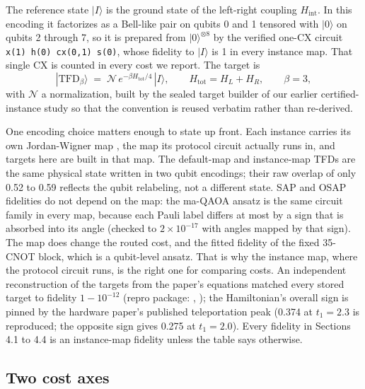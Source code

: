 \documentclass[11pt]{article}
\begin{document}
The reference state $|I\rangle$ is the ground state of the left-right coupling $H_{\mathrm{int}}$. In this encoding it factorizes as a Bell-like pair on qubits 0 and 1 tensored with $|0\rangle$ on qubits 2 through 7, so it is prepared from $|0\rangle^{\otimes 8}$ by the verified one-CX circuit \texttt{x(1) h(0) cx(0,1) s(0)}, whose fidelity to $|I\rangle$ is 1 in every instance map. That single CX is counted in every cost we report. The target is
\begin{equation}
|\mathrm{TFD}_\beta\rangle \;=\; \mathcal{N}\, e^{-\beta H_{\mathrm{tot}}/4}\,|I\rangle, \qquad H_{\mathrm{tot}} = H_L + H_R, \qquad \beta = 3,
\end{equation}
with $\mathcal{N}$ a normalization, built by the sealed target builder of our earlier certified-instance study so that the convention is reused verbatim rather than re-derived.

One encoding choice matters enough to state up front. Each instance carries its own Jordan-Wigner map \cite{jordanwigner1928}, the map its protocol circuit actually runs in, and targets here are built in that map. The default-map and instance-map TFDs are the same physical state written in two qubit encodings; their raw overlap of only 0.52 to 0.59 reflects the qubit relabeling, not a different state. SAP and OSAP fidelities do not depend on the map: the ma-QAOA ansatz is the same circuit family in every map, because each Pauli label differs at most by a sign that is absorbed into its angle (checked to $2\times 10^{-17}$ with angles mapped by that sign). The map does change the routed cost, and the fitted fidelity of the fixed 35-CNOT block, which is a qubit-level ansatz. That is why the instance map, where the protocol circuit runs, is the right one for comparing costs. An independent reconstruction of the targets from the paper's equations matched every stored target to fidelity $1 - 10^{-12}$ (repro package: , ); the Hamiltonian's overall sign is pinned by the hardware paper's published teleportation peak (0.374 at $t_1 = 2.3$ is reproduced; the opposite sign gives 0.275 at $t_1 = 2.0$). Every fidelity in Sections 4.1 to 4.4 is an instance-map fidelity unless the table says otherwise.

\subsection{Two cost axes}
\end{document}
